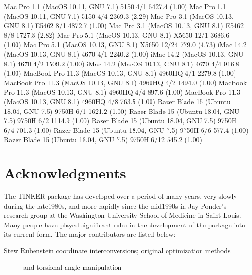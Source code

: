 \documentclass[letterpaper,11pt,english]{sphinxmanual}
\begin{document}
\begin{sphinxVerbatim}[commandchars=\\\{\}]
Mac Pro 1.1 (MacOS 10.11, GNU 7.1)             5150           4/1      5427.4 (1.00)
Mac Pro 1.1 (MacOS 10.11, GNU 7.1)             5150           4/4      2369.3 (2.29)
Mac Pro 3.1 (MacOS 10.13, GNU 8.1)            E5462           8/1      4872.7 (1.00)
Mac Pro 3.1 (MacOS 10.13, GNU 8.1)            E5462           8/8      1727.8 (2.82)
Mac Pro 5.1 (MacOS 10.13, GNU 8.1)            X5650          12/1      3686.6 (1.00)
Mac Pro 5.1 (MacOS 10.13, GNU 8.1)            X5650         12/24       779.0 (4.73)
iMac 14.2 (MacOS 10.13, GNU 8.1)               4670           4/1      2240.2 (1.00)
iMac 14.2 (MacOS 10.13, GNU 8.1)               4670           4/2      1509.2 (1.00)
iMac 14.2 (MacOS 10.13, GNU 8.1)               4670           4/4       916.8 (1.00)
MacBook Pro 11.3 (MacOS 10.13, GNU 8.1)      4960HQ           4/1      2279.8 (1.00)
MacBook Pro 11.3 (MacOS 10.13, GNU 8.1)      4960HQ           4/2      1494.0 (1.00)
MacBook Pro 11.3 (MacOS 10.13, GNU 8.1)      4960HQ           4/4       897.6 (1.00)
MacBook Pro 11.3 (MacOS 10.13, GNU 8.1)      4960HQ           4/8       763.5 (1.00)
Razer Blade 15 (Ubuntu 18.04, GNU 7.5)        9750H           6/1      1621.2 (1.00)
Razer Blade 15 (Ubuntu 18.04, GNU 7.5)        9750H           6/2      1114.9 (1.00)
Razer Blade 15 (Ubuntu 18.04, GNU 7.5)        9750H           6/4       701.3 (1.00)
Razer Blade 15 (Ubuntu 18.04, GNU 7.5)        9750H           6/6       577.4 (1.00)
Razer Blade 15 (Ubuntu 18.04, GNU 7.5)        9750H          6/12       545.2 (1.00)
\end{sphinxVerbatim}


\chapter{Acknowledgments}
\label{\detokenize{text/acknowledgements:acknowledgments}}\label{\detokenize{text/acknowledgements::doc}}
The TINKER package has developed over a period of many years, very slowly during the late\sphinxhyphen{}1980s, and more rapidly since the mid\sphinxhyphen{}1990s in Jay Ponder’s research group at the Washington University School of Medicine in Saint Louis. Many people have played significant roles in the development of the package into its current form. The major contributors are listed below:
\begin{description}
\item[{Stew Rubenstein coordinate interconversions; original optimization methods}] \leavevmode
and torsional angle manipulation

\end{description}
\end{document}
